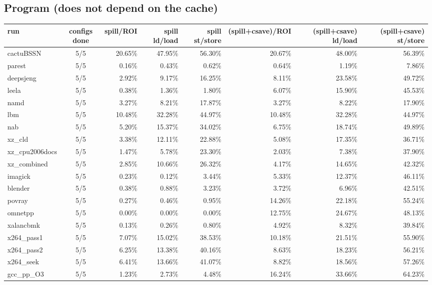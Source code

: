 \documentclass[10pt,a4paper,landscape]{article}
\begin{document}
\subsection*{Program (does not depend on the cache)}
{\footnotesize
\begin{longtable}{lcrrrrrr}
\toprule
run & configs done & spill/ROI & spill ld/load & spill st/store & (spill+csave)/ROI & (spill+csave) ld/load & (spill+csave) st/store \\
\midrule
\endhead
\bottomrule
\endfoot
cactuBSSN & 5/5 & 20.65\% & 47.95\% & 56.30\% & 20.67\% & 48.00\% & 56.39\% \\
parest & 5/5 & 0.16\% & 0.43\% & 0.62\% & 0.64\% & 1.19\% & 7.86\% \\
deepsjeng & 5/5 & 2.92\% & 9.17\% & 16.25\% & 8.11\% & 23.58\% & 49.72\% \\
leela & 5/5 & 0.38\% & 1.36\% & 1.80\% & 6.07\% & 15.90\% & 45.53\% \\
namd & 5/5 & 3.27\% & 8.21\% & 17.87\% & 3.27\% & 8.22\% & 17.90\% \\
lbm & 5/5 & 10.48\% & 32.28\% & 44.97\% & 10.48\% & 32.28\% & 44.97\% \\
nab & 5/5 & 5.20\% & 15.37\% & 34.02\% & 6.75\% & 18.74\% & 49.89\% \\
xz\_cld & 5/5 & 3.38\% & 12.11\% & 22.88\% & 5.08\% & 17.35\% & 36.71\% \\
xz\_cpu2006docs & 5/5 & 1.47\% & 5.78\% & 23.30\% & 2.03\% & 7.38\% & 37.90\% \\
xz\_combined & 5/5 & 2.85\% & 10.66\% & 26.32\% & 4.17\% & 14.65\% & 42.32\% \\
imagick & 5/5 & 0.23\% & 0.12\% & 3.44\% & 5.33\% & 12.37\% & 46.11\% \\
blender & 5/5 & 0.38\% & 0.88\% & 3.23\% & 3.72\% & 6.96\% & 42.51\% \\
povray & 5/5 & 0.27\% & 0.46\% & 0.95\% & 14.26\% & 22.18\% & 55.24\% \\
omnetpp & 5/5 & 0.00\% & 0.00\% & 0.00\% & 12.75\% & 24.67\% & 48.13\% \\
xalancbmk & 5/5 & 0.13\% & 0.26\% & 0.80\% & 4.92\% & 8.32\% & 39.84\% \\
x264\_pass1 & 5/5 & 7.07\% & 15.02\% & 38.53\% & 10.18\% & 21.51\% & 55.90\% \\
x264\_pass2 & 5/5 & 6.25\% & 13.38\% & 40.16\% & 8.63\% & 18.23\% & 56.21\% \\
x264\_seek & 5/5 & 6.41\% & 13.66\% & 41.07\% & 8.82\% & 18.56\% & 57.26\% \\
gcc\_pp\_O3 & 5/5 & 1.23\% & 2.73\% & 4.48\% & 16.24\% & 33.66\% & 64.23\% \\

\end{longtable}}
\end{document}
